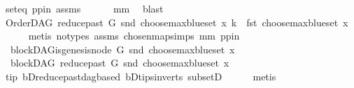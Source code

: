 \begin{isabellebody}
\ seteq\ pp{\isacharunderscore}{\kern0pt}in\ assms{\isacharparenleft}{\kern0pt}{}{\isacharparenright}{\kern0pt}\isanewline
\ \ \ \ \ \ mm\ \isamarkupfalse%
\ blast\ \isanewline
\ \ \isamarkupfalse%
\ {\isachardoublequoteopen}OrderDAG\ {\isacharparenleft}{\kern0pt}reduce{\isacharunderscore}{\kern0pt}past\ G\ {\isacharparenleft}{\kern0pt}snd\ {\isacharparenleft}{\kern0pt}choose{\isacharunderscore}{\kern0pt}max{\isacharunderscore}{\kern0pt}blue{\isacharunderscore}{\kern0pt}set\ x{\isacharparenright}{\kern0pt}{\isacharparenright}{\kern0pt}{\isacharparenright}{\kern0pt}\ k\ {\isacharequal}{\kern0pt}\ fst\ {\isacharparenleft}{\kern0pt}choose{\isacharunderscore}{\kern0pt}max{\isacharunderscore}{\kern0pt}blue{\isacharunderscore}{\kern0pt}set\ x{\isacharparenright}{\kern0pt}{\isachardoublequoteclose}\isanewline
\ \ \ \ \isamarkupfalse%
\ {\isacharparenleft}{\kern0pt}metis\ {\isacharparenleft}{\kern0pt}no{\isacharunderscore}{\kern0pt}types{\isacharparenright}{\kern0pt}\ assms{\isacharparenleft}{\kern0pt}{}{\isacharparenright}{\kern0pt}\ chosen{\isacharunderscore}{\kern0pt}map{\isacharunderscore}{\kern0pt}simps{}\ mm\ pp{\isacharunderscore}{\kern0pt}in{\isacharparenright}{\kern0pt}\ \isanewline
\ \ \isamarkupfalse%
\ {\isachardoublequoteopen}{\isasymnot}\ blockDAG{\isachardot}{\kern0pt}is{\isacharunderscore}{\kern0pt}genesis{\isacharunderscore}{\kern0pt}node\ G\ {\isacharparenleft}{\kern0pt}snd\ {\isacharparenleft}{\kern0pt}choose{\isacharunderscore}{\kern0pt}max{\isacharunderscore}{\kern0pt}blue{\isacharunderscore}{\kern0pt}set\ x{\isacharparenright}{\kern0pt}{\isacharparenright}{\kern0pt}{\isachardoublequoteclose}\isanewline
\ \ \isamarkupfalse%
\ \isamarkupfalse%
\ {\isachardoublequoteopen}\ blockDAG\ {\isacharparenleft}{\kern0pt}reduce{\isacharunderscore}{\kern0pt}past\ G\ {\isacharparenleft}{\kern0pt}snd\ {\isacharparenleft}{\kern0pt}choose{\isacharunderscore}{\kern0pt}max{\isacharunderscore}{\kern0pt}blue{\isacharunderscore}{\kern0pt}set\ x{\isacharparenright}{\kern0pt}{\isacharparenright}{\kern0pt}{\isacharparenright}{\kern0pt}{\isachardoublequoteclose}\isanewline
\ \ \ \ \isamarkupfalse%
\ tip\ bD{\isachardot}{\kern0pt}reduce{\isacharunderscore}{\kern0pt}past{\isacharunderscore}{\kern0pt}dagbased\ bD{\isachardot}{\kern0pt}tips{\isacharunderscore}{\kern0pt}in{\isacharunderscore}{\kern0pt}verts\ subsetD\isanewline
\ \ \ \ \isamarkupfalse%
\ metis\ \ \ \ \isanewline
{}\isamarkupfalse%

\end{isabellebody}
